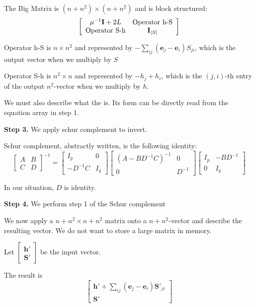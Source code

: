 \documentclass{article}
\begin{document}
The Big Matrix is $(n+n^2) \times (n+n^2)$ and is block structured:
\[
\left[\begin{array}{cc} 
\mu^{-1} \mathbf{I} + 2L & \textrm{Operator h-S} \\
\textrm{Operator S-h} & \mathbf{I}_{|S|}
\end{array}\right]
\]

Operator h-S is $n \times n^2$ and represented by $-\sum_{ij} (\mathbf{e}_j - \mathbf{e}_i) S_{ji}$, which is the output vector when we multiply by $S$

Operator S-h is $n^2 \times n$ and represented by $ - h_j + h_i$, which is the $(j,i)$-th entry of the output $n^2$-vector when we multiply by $h$. 

We must also describe what the  is. Its form can be directly read from the equation array in step 1.

\textbf{Step 3.} We apply schur complement to invert.

Schur complement, abstractly written, is the following identity:
\[
\left[ \begin{array}{cc} A & B \\ C & D \end{array} \right]^{-1} = 
\left[ \begin{array}{cc} I_p & 0 \\ -D^{-1} C & I_q \end{array} \right]
\left[ \begin{array}{cc} (A - BD^{-1}C)^{-1} & 0 \\ 0 & D^{-1} \end{array} \right]
\left[ \begin{array}{cc} I_p & - B D^{-1} \\ 0 & I_q \end{array} \right]
\]

In our situation, $D$ is identity. 

\textbf{Step 4.} We perform step 1 of the Schur complement

We now apply a $n+n^2 \times n+n^2$ matrix onto a $n + n^2$-vector and describe the resulting vector. We do not want to store a large matrix in memory.

Let $\left[ \begin{array}{c} \mathbf{h}' \\ \mathbf{S}' \end{array} \right]$ be the input vector.

The result is
\[
\left[ \begin{array}{c}
\mathbf{h}' + \sum_{ij} (\mathbf{e}_j - \mathbf{e}_i) \mathbf{S}'_{ji} \\
\mathbf{S}'
\end{array}\right]
\]
\end{document}

